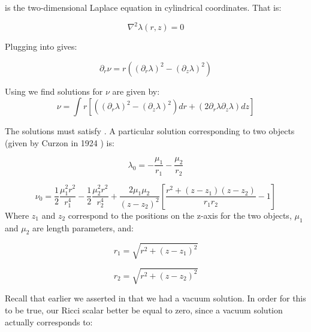 \documentclass{article}
\begin{document}
 is the two-dimensional Laplace equation in cylindrical coordinates. That is:

\begin{equation}
\nabla^2\lambda(r,z)=0
\label{eq:laplace-r-z}
\end{equation}

Plugging  into  gives:

\begin{equation}
\partial_{r}\nu=r\left(\left(\partial_{r}\lambda\right)^{2}-\left(\partial_{z}\lambda\right)^{2}\right)\label{eq:nu_r}
\end{equation}

Using  we find solutions for $\nu$ are given by:
\begin{equation}
\nu=\int r[\left(\left(\partial_{r}\lambda\right)^{2}-\left(\partial_{z}\lambda\right)^{2}\right)dr+\left(2\partial_{r}\lambda\partial_{z}\lambda\right)dz]\label{eq:nu}
\end{equation}

The solutions must satisfy . A particular solution corresponding to two objects (given by Curzon in 1924 \cite{curzon1924} ) is:

\begin{equation}
\lambda_0=-\frac{\mu_1}{r_1}-\frac{\mu_2}{r_2}
\label{eq:lambda-0}
\end{equation}

\begin{equation}
	\label{eq:nu-0}
	\nu_0=\frac{1}{2}\frac{\mu_{1}^{2}r^2}{r_{1}^{4}}-\frac{1}{2}\frac{\mu_{2}^{2}r^2}{r_{2}^{4}}+\frac{2\mu_1\mu_2}{(z-z_2)^2}\left[\frac{r^2+(z-z_1)(z-z_2)}{r_{1}r_{2}}-1\right]
\end{equation}
Where $z_1$ and $z_2$ correspond to the positions on the z-axis for the two objects, $\mu_1$ and $\mu_2$ are length parameters, and:

\begin{equation}
r_1=\sqrt{r^2+(z-z_1)^2}
\label{eq:r_1}
\end{equation}

\begin{equation}
r_2=\sqrt{r^2+(z-z_2)^2}
\label{eq:r_2}
\end{equation}

Recall that earlier we asserted in  that we had a vacuum solution. In order for this to be true, our Ricci scalar better be equal to zero, since a vacuum solution actually corresponds to:
\end{document}
